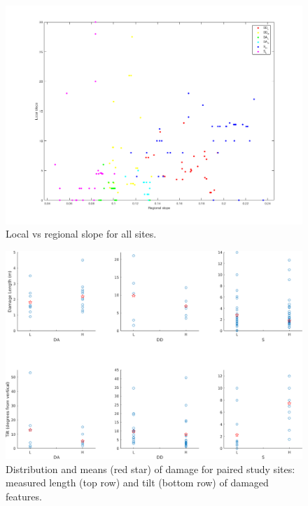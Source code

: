 \documentclass[final,12pt,times,twocolumn,authoryear]{elsarticle}
\begin{document}
\begin{figure}[hbt]
	\centering
	\includegraphics[width=\linewidth]{fig/local_vs_regional_slope_all_sites}
	\caption{Local vs regional slope for all sites.}
	\label{fig:slopelocalreg}
\end{figure}

\begin{figure}[hbt]
	\centering
	\includegraphics[width=\linewidth]{fig/length-tilt-LH}
	\caption{Distribution and means (red star) of damage for paired study sites: measured length (top row) and tilt (bottom row) of damaged features.}
	\label{fig:distmeansdmg}
\end{figure}
\end{document}

